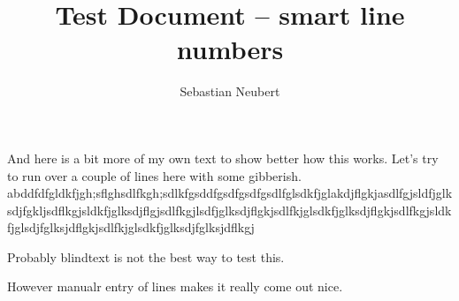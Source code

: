 \documentclass[12pt]{article}
\begin{document}

\title{Test Document -- smart line numbers}
\author{Sebastian Neubert}
\date{}
\maketitle
\thispagestyle{empty}
\pagestyle{empty}

\blindtext

And here is a bit more of my own text to show better how this works. Let's try to run over a couple of lines here with some gibberish.
abddfdfgldkfjgh;sflghsdlfkgh;sdlkfgsddfgsdfgsdfgsdlfglsdkfjglakdjflgkjasdlfgjsldfjglksdjfgkljsdflkgjsldkfjglksdjflgjsdlfkgjlsdfjglksdjflgkjsdlfkjglsdkfjglksdjflgkjsdlfkgjsldkfjglsdjfglksjdflgkjsdlfkjglsdkfjglksdjfglksjdflkgj

Probably blindtext is not the best way to test this.

However manualr entry of lines makes it really come out nice.
\end{document}
